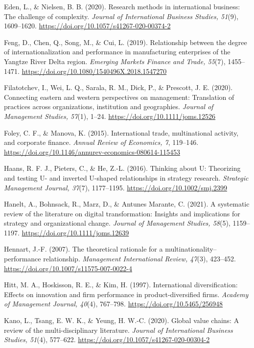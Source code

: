 \documentclass[12pt,a4paper]{article}
\begin{document}
Eden, L., \& Nielsen, B. B. (2020). Research methods in international
business: The challenge of complexity. \emph{Journal of International
Business Studies, 51}(9), 1609--1620.
\url{https://doi.org/10.1057/s41267-020-00374-2}

Feng, D., Chen, Q., Song, M., \& Cui, L. (2019). Relationship between
the degree of internationalization and performance in manufacturing
enterprises of the Yangtze River Delta region. \emph{Emerging Markets
Finance and Trade, 55}(7), 1455--1471.
\url{https://doi.org/10.1080/1540496X.2018.1547270}

Filatotchev, I., Wei, L. Q., Sarala, R. M., Dick, P., \& Prescott, J. E.
(2020). Connecting eastern and western perspectives on management:
Translation of practices across organizations, institution and
geographies. \emph{Journal of Management Studies, 57}(1), 1--24.
\url{https://doi.org/10.1111/joms.12526}

Foley, C. F., \& Manova, K. (2015). International trade, multinational
activity, and corporate finance. \emph{Annual Review of Economics, 7},
119--146. \url{https://doi.org/10.1146/annurev-economics-080614-115453}

Haans, R. F. J., Pieters, C., \& He, Z.-L. (2016). Thinking about U:
Theorizing and testing U- and inverted U-shaped relationships in
strategy research. \emph{Strategic Management Journal, 37}(7),
1177--1195. \url{https://doi.org/10.1002/smj.2399}

Hanelt, A., Bohnsack, R., Marz, D., \& Antunes Marante, C. (2021). A
systematic review of the literature on digital transformation: Insights
and implications for strategy and organizational change. \emph{Journal
of Management Studies, 58}(5), 1159--1197.
\url{https://doi.org/10.1111/joms.12639}

Hennart, J.-F. (2007). The theoretical rationale for a
multinationality--performance relationship. \emph{Management
International Review, 47}(3), 423--452.
\url{https://doi.org/10.1007/s11575-007-0022-4}

Hitt, M. A., Hoskisson, R. E., \& Kim, H. (1997). International
diversification: Effects on innovation and firm performance in
product-diversified firms. \emph{Academy of Management Journal, 40}(4),
767--798. \url{https://doi.org/10.5465/256948}

Kano, L., Tsang, E. W. K., \& Yeung, H. W.-C. (2020). Global value
chains: A review of the multi-disciplinary literature. \emph{Journal of
International Business Studies, 51}(4), 577--622.
\url{https://doi.org/10.1057/s41267-020-00304-2}
\end{document}
